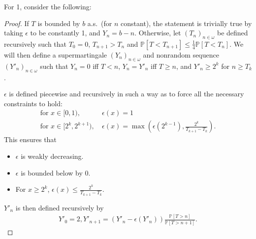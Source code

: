 For 1, consider the following:
\begin{proof}
If $T$ is bounded by $b$ a.s.~(for $n$ constant), the statement is trivially true by taking $\epsilon$ to be constantly 1, and $Y_n = b - n$.
Otherwise, let $(T_n)_{n \in \omega}$ be defined recursively such that $T_0 = 0$, $T_{n+1} > T_n$ and $\mathbb P[T < T_{n+1}] \leq \frac 1 4 \mathbb P[T < T_n]$. We will then define a supermartingale $(Y_n)_{n \in \omega}$ and nonrandom sequence $(Y'_n)_{n \in \omega}$ such that $Y_n = 0$ iff $T < n$, $Y_n = Y'_n$ iff $T \geq n$, and $Y'_n \geq 2^k$ for $n \geq T_k$.

$\epsilon$ is defined piecewise and recursively in such a way as to force all the necessary constraints to hold:
\begin{align*}
    \text{for }x \in [0,1),\ &\epsilon(x) = 1 \\
    \text{for }x \in [2^k,2^{k+1}),\ &\epsilon(x) = \max \left (\epsilon(2^{k-1}), \frac{2^k}{T_{k+1}-T_k} \right ).
\end{align*}
This ensures that
\begin{itemize}
\item $\epsilon$ is weakly decreasing.
\item $\epsilon$ is bounded below by 0.
\item For $x \geq 2^k$, $\epsilon(x) \leq \frac{2^k}{T_{k+1}-T_k}$.
\end{itemize}

$Y'_n$ is then defined recursively by
\begin{align*}
    Y'_0 = 2,
    Y'_{n+1} = (Y'_n - \epsilon(Y'_n)) \frac{\mathbb P[T > n]}{\mathbb P[T > n+1]}.
\end{align*}


\end{proof}
